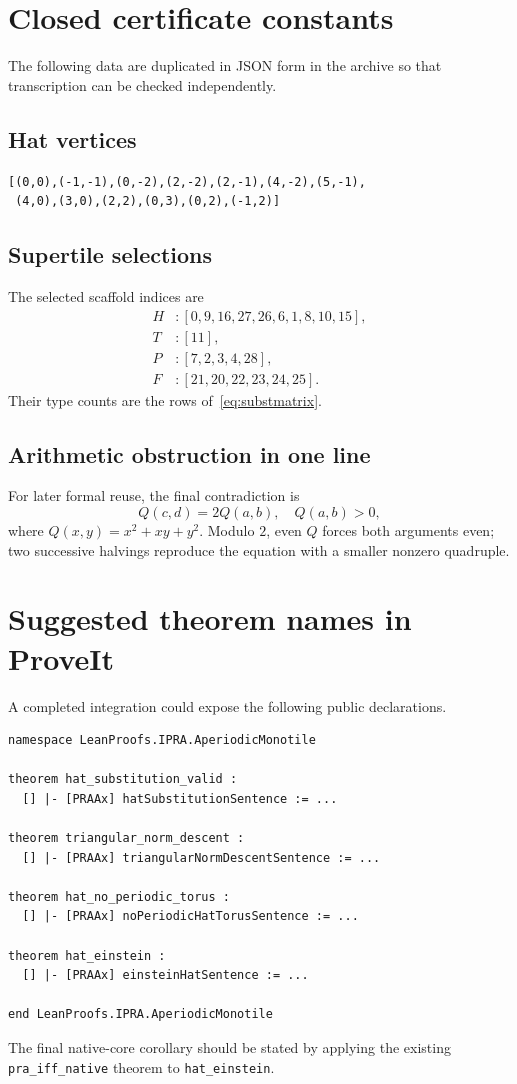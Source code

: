 \documentclass[11pt]{article}
\begin{document}
\appendix
\section{Closed certificate constants}
The following data are duplicated in JSON form in the archive so that transcription can
be checked independently.

\subsection{Hat vertices}
\begin{lstlisting}
[(0,0),(-1,-1),(0,-2),(2,-2),(2,-1),(4,-2),(5,-1),
 (4,0),(3,0),(2,2),(0,3),(0,2),(-1,2)]
\end{lstlisting}

\subsection{Supertile selections}
The selected scaffold indices are
\begin{align*}
H&:[0,9,16,27,26,6,1,8,10,15],\\
T&:[11],\\
P&:[7,2,3,4,28],\\
F&:[21,20,22,23,24,25].
\end{align*}
Their type counts are the rows of~\eqref{eq:substmatrix}.

\subsection{Arithmetic obstruction in one line}
For later formal reuse, the final contradiction is
\[
  Q(c,d)=2Q(a,b),\quad Q(a,b)>0,
\]
where $Q(x,y)=x^2+xy+y^2$.  Modulo $2$, even $Q$ forces both arguments even; two
successive halvings reproduce the equation with a smaller nonzero quadruple.

\section{Suggested theorem names in ProveIt}
A completed integration could expose the following public declarations.
\begin{lstlisting}
namespace LeanProofs.IPRA.AperiodicMonotile

theorem hat_substitution_valid :
  [] |- [PRAAx] hatSubstitutionSentence := ...

theorem triangular_norm_descent :
  [] |- [PRAAx] triangularNormDescentSentence := ...

theorem hat_no_periodic_torus :
  [] |- [PRAAx] noPeriodicHatTorusSentence := ...

theorem hat_einstein :
  [] |- [PRAAx] einsteinHatSentence := ...

end LeanProofs.IPRA.AperiodicMonotile
\end{lstlisting}
The final native-core corollary should be stated by applying the existing
\texttt{pra\_iff\_native} theorem to \texttt{hat\_einstein}.
\end{document}
